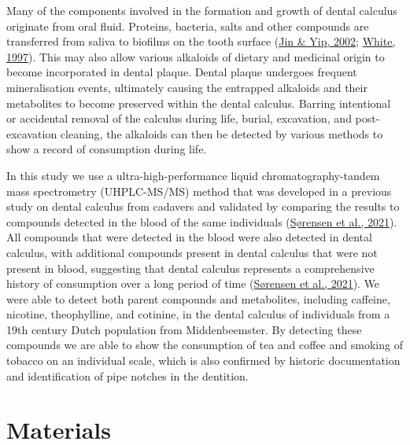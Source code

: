 \documentclass[
  b5paper,
]{book}
\begin{document}
Many of the components involved in the formation and growth of dental
calculus originate from oral fluid. Proteins, bacteria, salts and other
compounds are transferred from saliva to biofilms on the tooth surface
(\protect\hyperlink{ref-jinSupragingivalCalculus2002}{Jin \& Yip, 2002};
\protect\hyperlink{ref-whiteDentalCalculus1997}{White, 1997}). This may
also allow various alkaloids of dietary and medicinal origin to become
incorporated in dental plaque. Dental plaque undergoes frequent
mineralisation events, ultimately causing the entrapped alkaloids and
their metabolites to become preserved within the dental calculus.
Barring intentional or accidental removal of the calculus during life,
burial, excavation, and post-excavation cleaning, the alkaloids can then
be detected by various methods to show a record of consumption during
life.

In this study we use a ultra-high-performance liquid
chromatography-tandem mass spectrometry (UHPLC-MS/MS) method that was
developed in a previous study on dental calculus from cadavers and
validated by comparing the results to compounds detected in the blood of
the same individuals
(\protect\hyperlink{ref-sorensenDrugsCalculus2021}{Sørensen et al.,
2021}). All compounds that were detected in the blood were also detected
in dental calculus, with additional compounds present in dental calculus
that were not present in blood, suggesting that dental calculus
represents a comprehensive history of consumption over a long period of
time (\protect\hyperlink{ref-sorensenDrugsCalculus2021}{Sørensen et al.,
2021}). We were able to detect both parent compounds and metabolites,
including caffeine, nicotine, theophylline, and cotinine, in the dental
calculus of individuals from a 19th century Dutch population from
Middenbeemster. By detecting these compounds we are able to show the
consumption of tea and coffee and smoking of tobacco on an individual
scale, which is also confirmed by historic documentation and
identification of pipe notches in the dentition.

\hypertarget{mb11CalculusPilot-mat}{%
\section{Materials}\label{mb11CalculusPilot-mat}}
\end{document}
